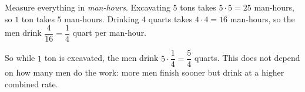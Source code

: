 Measure everything in \emph{man-hours}. Excavating $5$ tons takes $5\cdot5=25$ man-hours, so $1$ ton takes $5$ man-hours. Drinking $4$ quarts takes $4\cdot4=16$ man-hours, so the men drink $\dfrac{4}{16}=\dfrac{1}{4}$ quart per man-hour.

So while $1$ ton is excavated, the men drink $5\cdot\dfrac{1}{4}=\boxed{\dfrac{5}{4}}$ quarts. This does not depend on how many men do the work: more men finish sooner but drink at a higher combined rate.
